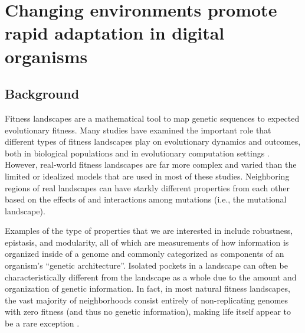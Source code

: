 \documentclass[PhD]{msu-thesis}
\begin{document}




\chapter{Changing environments promote rapid adaptation in digital organisms}


\section{Background}
Fitness landscapes are a mathematical tool to map genetic sequences to expected evolutionary fitness. Many studies have examined the important role that different types of fitness landscapes play on evolutionary dynamics and outcomes, both in biological populations \cite{khan_negative_2011,szendro_quantitative_2013,weinreich_darwinian_2006,nahum_tortoisehare_2015} and in evolutionary computation settings \cite{merz_fitness_2000,humeau_paradiseo-mo:_2013,kallel_theoretical_2013}. However, real-world fitness landscapes are far more complex and varied than the limited or idealized models that are used in most of these studies. Neighboring regions of real landscapes can have starkly different properties from each other based on the effects of and interactions among mutations (i.e., the mutational landscape).  

Examples of the type of properties that we are interested in include robustness, epistasis, and modularity, all of which are measurements of how information is organized inside of a genome and commonly categorized as components of an organism's ``genetic architecture''. Isolated pockets in a landscape can often be characteristically different from the landscape as a whole due to the amount and organization of genetic information.  In fact, in most natural fitness landscapes, the vast majority of neighborhoods consist entirely of non-replicating genomes with zero fitness (and thus no genetic information), making life itself appear to be a rare exception \cite{gavrilets_fitness_2004}.
\end{document}
